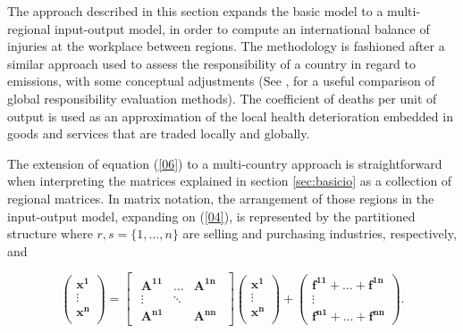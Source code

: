 \documentclass[a4paper,12pt]{article}
\begin{document}
The approach described in this section expands the basic model to a multi-regional input-output model, in order to compute an international balance of injuries at the workplace between regions. The methodology is fashioned after a similar approach used to assess the responsibility of a country in regard to emissions, with some conceptual adjustments (See \citealp{serranodietz2010}, for a useful comparison of global responsibility evaluation methods). The coefficient of deaths per unit of output is used as
an approximation of the local health deterioration embedded in goods and services that are traded locally and globally. 


The extension of equation (\ref{06}) to a multi-country approach is straightforward when interpreting the matrices explained in section \ref{sec:basicio} as a collection of regional matrices. In matrix notation, the arrangement of those regions in the input-output model, expanding on (\ref{04}), is represented by the partitioned structure where $r,s=\{1,\ldots,n\}$ are selling and purchasing industries, respectively, and

\begin{equation} 
\left( \begin{array}{c} 
\mathbf{x^1} \\ 
\vdots\\ 
\mathbf{x^n}\\ 
\end{array} \right) = 
\begin{bmatrix}
\begin{array}{ccc} 
\mathbf{A^{11}} & \ldots & \mathbf{A^{1n}} \\ 
\vdots &  \ddots &  \\ \mathbf{A^{n1}} &  & \mathbf{A^{nn}}
\end{array} 
\end{bmatrix} 
\left( \begin{array}{c} \mathbf{x^1} \\ \vdots\\ \mathbf{x^n}\\ \end{array} \right) + \left(
\begin{array}{c} \mathbf{f^{11}} +  \ldots  +  \mathbf{f^{1n}} \\ \vdots  \\ \mathbf{f^{n1}}  +  \ldots  +  \mathbf{f^{nn}}
\end{array} 
\right) 
\label{07} .
\end{equation}
\end{document}
